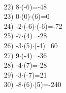 \documentclass[a4paper,10pt]{article}
\begin{document}
\vspace{0.5cm}\\22)   8$\cdot$(-6)=-48
\vspace{0.5cm}\\23)   0$\cdot$(0)$\cdot$(6)=0
\vspace{0.5cm}\\24)   -2$\cdot$(-6)$\cdot$(-6)=-72
\vspace{0.5cm}\\25)   -7$\cdot$(4)=-28
\vspace{0.5cm}\\26)   -3$\cdot$(5)$\cdot$(-4)=60
\vspace{0.5cm}\\27)   9$\cdot$(-4)=-36
\vspace{0.5cm}\\28)   -4$\cdot$(7)=-28
\vspace{0.5cm}\\29)   -3$\cdot$(-7)=21
\vspace{0.5cm}\\30)   -8$\cdot$(6)$\cdot$(5)=-240
\vspace{0.5cm}\\\pagebreak
\end{document}

